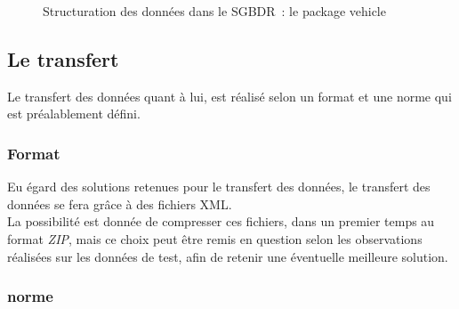 \begin{figure}[htbp]
	\centering
	\caption{Structuration des données dans le SGBDR~: le package vehicle}
	\label{DonneesStructurationSgbdrVehicle}
\end{figure}

\subsection{Le transfert}
Le transfert des données quant à lui, est réalisé selon un format et une norme qui est préalablement défini.

\subsubsection{Format}
Eu égard des solutions retenues pour le transfert des données, le transfert des données se fera grâce à des fichiers XML. \\
La possibilité est donnée de compresser ces fichiers, dans un premier temps au format \emph{ZIP}, mais ce choix peut être remis en question selon les observations réalisées sur les données de test, afin de retenir une éventuelle meilleure solution.

\subsubsection{norme}
% 
% 

